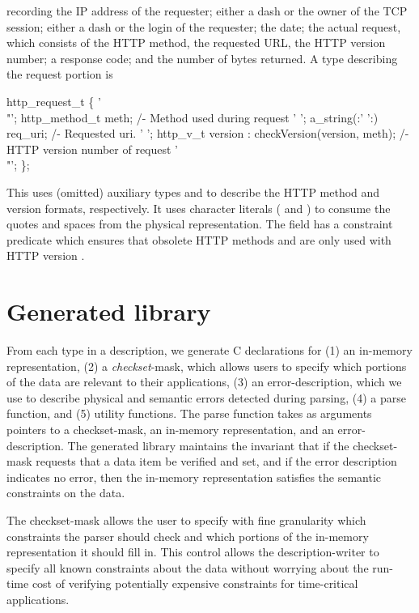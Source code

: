 \noindent
recording the IP address of the requester; either a dash or the owner
of the TCP session; either a dash or the login of the requester; the
date; the actual request, which consists of the HTTP method, the
requested URL, the HTTP version number; a response code; and the
number of bytes returned.  A \padsl{} type describing the request
portion is
\begin{code}
 http_request_t \{
  '\\"'; http_method_t   meth;           /- Method used during request
  ' ';  a_string(:' ':) req_uri;        /- Requested uri.
  ' ';  http_v_t        version : checkVersion(version, meth);
                                        /- HTTP version number of request 
  '\\"';
\};
\end{code}
This  uses (omitted) auxiliary types  and
 to describe
the HTTP method and version formats, respectively.
It uses character literals ( and ) to consume
the quotes and 
spaces from the physical representation. 
The  field has a constraint predicate 
which ensures that obsolete HTTP methods  and  
are only used with HTTP version .

\section{Generated library}
From each type in a \padsl{} description, we generate C declarations for
(1) an in-memory representation, 
(2) a {\em checkset}\/-mask, which allows users to specify 
which portions of the data are relevant to their applications,
(3) an error-description, which we use to describe physical and
semantic errors detected during parsing, 
(4) a parse function, and 
(5) utility functions.
The parse function takes as arguments pointers to a checkset-mask, an
in-memory representation, and an error-description.  The generated
library maintains the invariant that if the checkset-mask requests
that a data item be verified and set, and if the error description
indicates no error, then the in-memory representation satisfies the
semantic constraints on the data.

The checkset-mask allows the user to specify with fine granularity
which constraints the parser should check and which portions of the
in-memory representation it should fill in.  This control allows the
description-writer to specify all known constraints about the data
without worrying about the run-time cost of verifying potentially
expensive constraints for time-critical applications.

